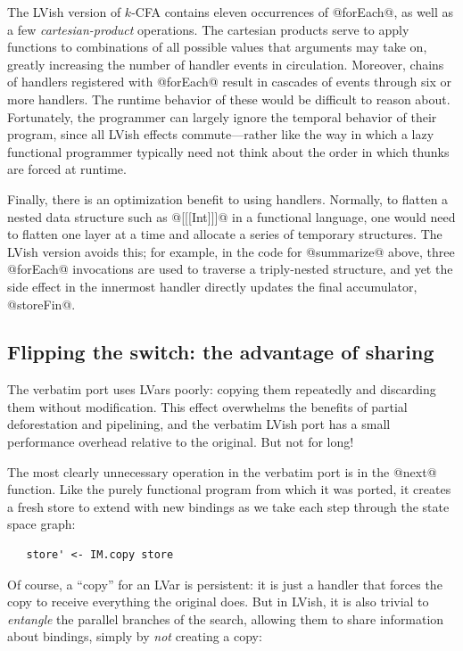 The LVish version of $k$-CFA contains eleven occurrences of @forEach@,
as well as a few \emph{cartesian-product} operations.  The cartesian
products serve to apply functions to combinations of all possible
values that arguments may take on, greatly increasing the number of
handler events in circulation.  Moreover, chains of handlers
registered with @forEach@ result in cascades of events through six or
more handlers.  The runtime behavior of these would be difficult to
reason about.  Fortunately, the programmer can largely ignore the
temporal behavior of their program, since all LVish effects
commute---rather like the way in which a lazy functional programmer
typically need not think about the order in which thunks are forced at
runtime.

Finally, there is an optimization benefit to using handlers.
Normally, to flatten a nested data structure such as @[[[Int]]]@ in a
functional language, one would need to flatten one layer at a time and
allocate a series of temporary structures.  The LVish version avoids
this; for example, in the code for @summarize@ above, three @forEach@
invocations are used to traverse a triply-nested structure, and yet
the side effect in the innermost handler directly updates the final
accumulator, @storeFin@.

\subsection{Flipping the switch: the advantage of sharing}

The verbatim port uses LVars poorly: copying them repeatedly and
discarding them without modification.  This effect overwhelms the
benefits of partial deforestation and pipelining, and the verbatim
LVish port has a small performance overhead relative to the original.
But not for long!

The most clearly unnecessary operation in the verbatim port is in the
@next@ function.  Like the purely functional program from which it was
ported, it creates a fresh store to extend with new bindings as we
take each step through the state space graph:

\singlespacing
\begin{lstlisting}
   store' <- IM.copy store 
\end{lstlisting}
\doublespacing

Of course, a ``copy'' for an LVar is persistent: it is just a handler
that forces the copy to receive everything the original does.  But in
LVish, it is also trivial to \emph{entangle} the parallel branches of
the search, allowing them to share information about bindings, simply
by \emph{not} creating a copy:

